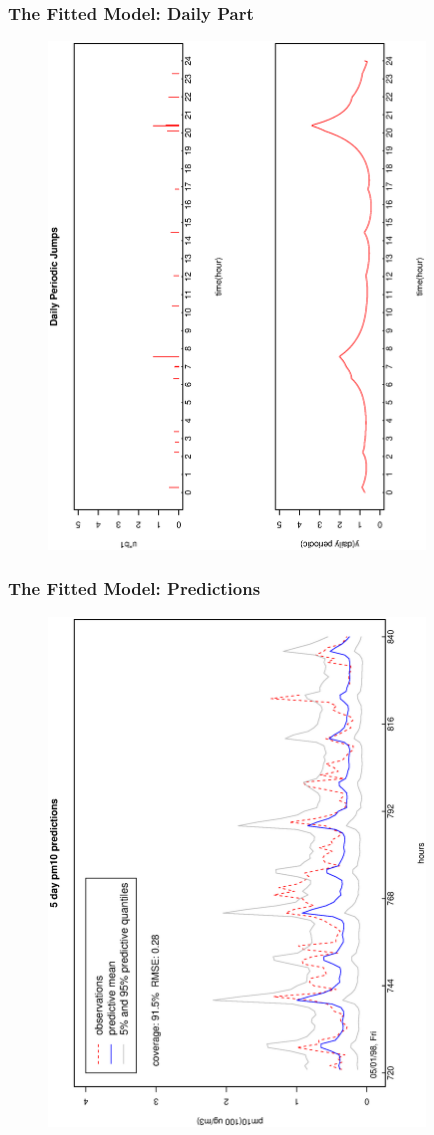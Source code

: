 \documentclass[dvips]{beamer}
\newcommand{\bs}[2]{\begin{frame} \frametitle{#1} 
{#2}
\end{frame} }
\begin{document}
\bs{The Fitted Model: Daily Part} {
\begin{figure}[!h]
  \begin{center}
    \includegraphics[angle=270,origin=l,totalheight=6truecm,
     clip=1,width=10cm]{pm10onefit.daily.ps}
  \end{center}
\end{figure}
}
\bs{The Fitted Model: Predictions} {
\begin{figure}[!h]
  \begin{center}
    \includegraphics[angle=270,origin=l,totalheight=6truecm,
     clip=1,width=10cm]{5daypm10pred.ps}
  \end{center}
\end{figure}
}
\end{document}
